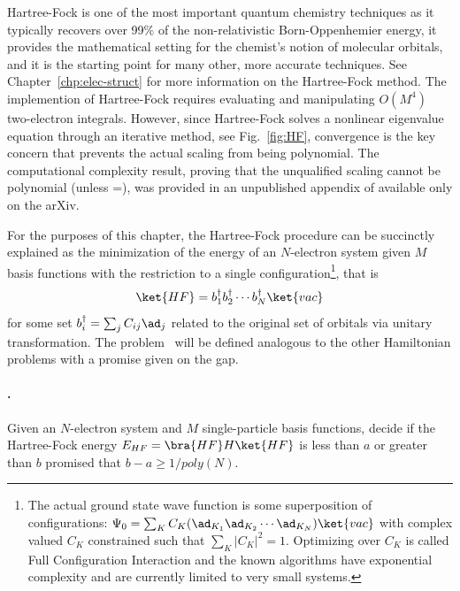 \documentclass[11pt,oneside,final]{huthesis}%
\begin{document}
Hartree-Fock is one of the most important quantum chemistry techniques as it typically recovers over 99\% of the non-relativistic Born-Oppenhemier energy, it provides the mathematical setting for the chemist's notion of molecular orbitals, and it is the starting point for many other, more accurate techniques. See Chapter~\ref{chp:elec-struct} for more information on the Hartree-Fock method.  The implemention of Hartree-Fock requires evaluating and manipulating $O(M^4)$ two-electron integrals.  However, since Hartree-Fock solves a nonlinear eigenvalue equation through an iterative method, see Fig.~\ref{fig:HF}, convergence is the key concern that prevents the actual scaling from being polynomial.  The computational complexity result, proving that the unqualified scaling cannot be polynomial (unless \p=\np), was provided in an unpublished appendix of \cite{Schuch09} available only on the arXiv.  

For the purposes of this chapter, the Hartree-Fock procedure can be succinctly explained as the minimization of the energy of an $N$-electron system given $M$ basis functions with the restriction to a single configuration\footnote{The actual ground state wave function is some superposition of configurations: $\Psi_0=\sum_K C_K (\ad_{K_1}\ad_{K_2}\cdots\ad_{K_N})\ket{vac}$ with complex valued $C_K$ constrained such that $\sum_K |C_K|^2=1$. Optimizing over $C_K$ is called Full Configuration Interaction and the known algorithms have exponential complexity and are currently limited to very small systems.}, that is $$\ket{HF}=b_1^\dagger b_2^\dagger \cdots b_N^\dagger\ket{vac}$$ for some set $b_i^\dagger=\sum_j C_{ij}\ad_j$ related to the original set of orbitals via unitary transformation. The problem \HF~will be defined analogous to the other Hamiltonian problems with a promise given on the gap.

\paragraph{\HF.} Given an $N$-electron system and $M$ single-particle basis functions, decide if the Hartree-Fock energy $E_{HF}=\bra{HF}H\ket{HF}$ is less than $a$ or greater than $b$ promised that $b-a\geq1/poly(N)$.
\end{document}
